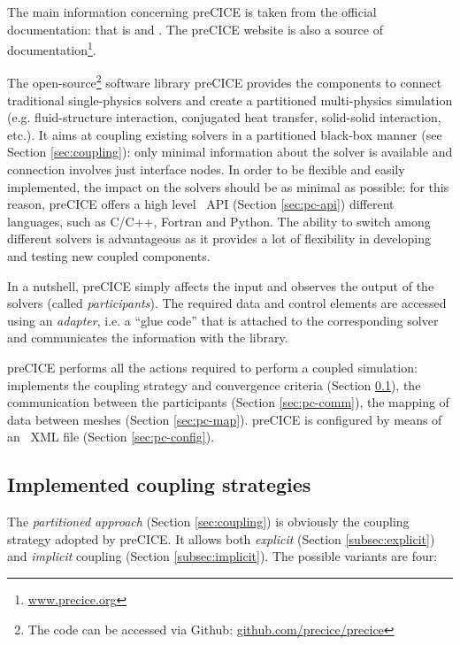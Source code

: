 The main information concerning preCICE is taken from the official documentation: that is \cite{gatzhammer2014efficient} and  \cite{bungartz2016precice}. The preCICE website is also a source of documentation\footnote{\href{http://www.precice.org}{www.precice.org}}.

The open-source\footnote{The code can be accessed via Github: \href{https://github.com/precice/precice}{github.com/precice/precice}} software library preCICE provides the components to connect traditional single-physics solvers and create a partitioned multi-physics simulation (e.g. fluid-structure interaction, conjugated heat transfer, solid-solid interaction, etc.).
It aims at coupling existing solvers in a partitioned black-box manner (see Section \ref{sec:coupling}):  only minimal information about the solver is available and connection involves just interface nodes. 
In order to be flexible and easily implemented, the impact on the solvers should be as minimal as possible: for this reason, preCICE offers a high level ~\ac{API} (Section \ref{sec:pc-api}) different languages, such as C/C++, Fortran and Python.
The ability to switch among different solvers is advantageous as it provides a lot of flexibility in developing and testing new coupled components.

In a nutshell, preCICE simply affects the input and observes the output of the solvers (called \textit{participants}). The required data and control elements are accessed using an \textit{adapter}, i.e. a  ``glue code'' that is attached to the corresponding solver and communicates the information with the library.

preCICE performs all the actions required to perform a coupled simulation: implements the coupling strategy and convergence criteria (Section \ref{sec:pc-coupling}), the communication
between the participants (Section \ref{sec:pc-comm}), the mapping of data between meshes (Section \ref{sec:pc-map}). preCICE is configured by means of an ~\ac{XML} file (Section \ref{sec:pc-config}).



\subsection{Implemented coupling strategies}
\label{sec:pc-coupling}

The \textit{partitioned approach} (Section \ref{sec:coupling}) is obviously the coupling strategy adopted by preCICE. It allows both \textit{explicit} (Section \ref{subsec:explicit}) and \textit{implicit} coupling (Section \ref{subsec:implicit}). The possible variants are four:

